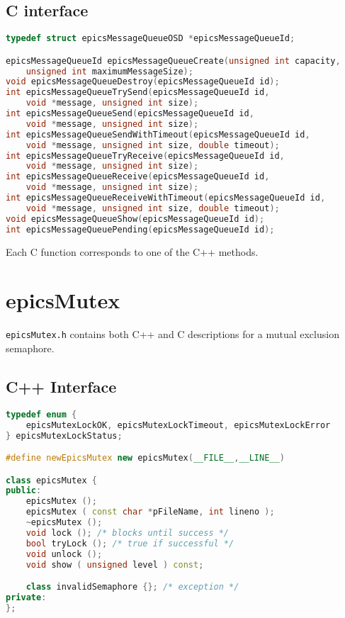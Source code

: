 \subsection{C interface}

\begin{lstlisting}[language=C]
typedef struct epicsMessageQueueOSD *epicsMessageQueueId;

epicsMessageQueueId epicsMessageQueueCreate(unsigned int capacity,
    unsigned int maximumMessageSize);
void epicsMessageQueueDestroy(epicsMessageQueueId id);
int epicsMessageQueueTrySend(epicsMessageQueueId id,
    void *message, unsigned int size);
int epicsMessageQueueSend(epicsMessageQueueId id,
    void *message, unsigned int size);
int epicsMessageQueueSendWithTimeout(epicsMessageQueueId id,
    void *message, unsigned int size, double timeout);
int epicsMessageQueueTryReceive(epicsMessageQueueId id,
    void *message, unsigned int size);
int epicsMessageQueueReceive(epicsMessageQueueId id,
    void *message, unsigned int size);
int epicsMessageQueueReceiveWithTimeout(epicsMessageQueueId id,
    void *message, unsigned int size, double timeout);
void epicsMessageQueueShow(epicsMessageQueueId id);
int epicsMessageQueuePending(epicsMessageQueueId id);
\end{lstlisting}

Each C function corresponds to one of the C++ methods.

\section{epicsMutex}

\verb|epicsMutex.h| contains both C++ and C descriptions for a mutual exclusion semaphore.

\subsection{C++ Interface}

\begin{lstlisting}[language=C++]
typedef enum {
    epicsMutexLockOK, epicsMutexLockTimeout, epicsMutexLockError
} epicsMutexLockStatus;

#define newEpicsMutex new epicsMutex(__FILE__,__LINE__)

class epicsMutex {
public:
    epicsMutex ();
    epicsMutex ( const char *pFileName, int lineno );
    ~epicsMutex ();
    void lock (); /* blocks until success */
    bool tryLock (); /* true if successful */
    void unlock ();
    void show ( unsigned level ) const;

    class invalidSemaphore {}; /* exception */
private:
};
\end{lstlisting}

